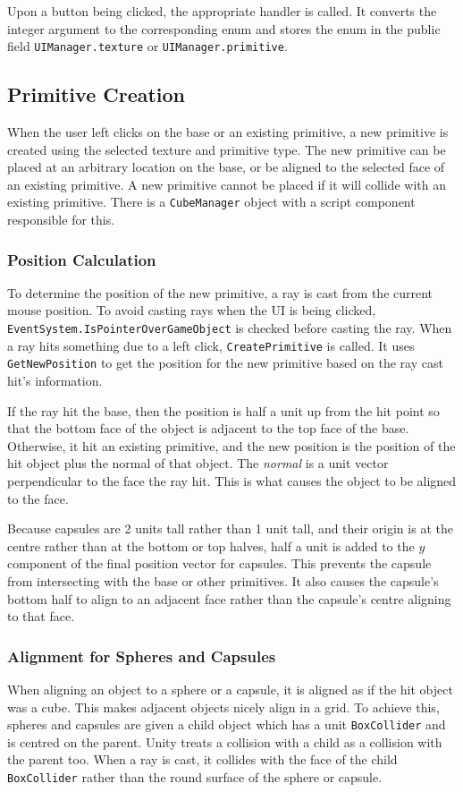 \documentclass[a4paper, 12pt]{scrartcl}
\begin{document}
Upon a button being clicked, the appropriate handler is called. It converts the integer argument to the corresponding enum and stores the enum in the public field \texttt{UIManager.texture} or \texttt{UIManager.primitive}.

\subsection{Primitive Creation}
When the user left clicks on the base or an existing primitive, a new primitive is created using the selected texture and primitive type. The new primitive can be placed at an arbitrary location on the base, or be aligned to the selected face of an existing primitive. A new primitive cannot be placed if it will collide with an existing primitive. There is a \texttt{CubeManager} object with a script component responsible for this.

\subsubsection{Position Calculation}
To determine the position of the new primitive, a ray is cast from the current mouse position. To avoid casting rays when the UI is being clicked, \texttt{EventSystem.IsPointerOverGameObject} is checked before casting the ray. When a ray hits something due to a left click, \texttt{CreatePrimitive} is called. It uses \texttt{GetNewPosition} to get the position for the new primitive based on the ray cast hit's information.

If the ray hit the base, then the position is half a unit up from the hit point so that the bottom face of the object is adjacent to the top face of the base. Otherwise, it hit an existing primitive, and the new position is the position of the hit object plus the normal of that object. The \textit{normal} is a unit vector perpendicular to the face the ray hit. This is what causes the object to be aligned to the face.

Because capsules are 2 units tall rather than 1 unit tall, and their origin is at the centre rather than at the bottom or top halves, half a unit is added to the $y$ component of the final position vector for capsules. This prevents the capsule from intersecting with the base or other primitives. It also causes the capsule's bottom half to align to an adjacent face rather than the capsule's centre aligning to that face.

\subsubsection{Alignment for Spheres and Capsules}
When aligning an object to a sphere or a capsule, it is aligned as if the hit object was a cube. This makes adjacent objects nicely align in a grid. To achieve this, spheres and capsules are given a child object which has a unit \texttt{BoxCollider} and is centred on the parent. Unity treats a collision with a child as a collision with the parent too. When a ray is cast, it collides with the face of the child \texttt{BoxCollider} rather than the round surface of the sphere or capsule.
\end{document}
